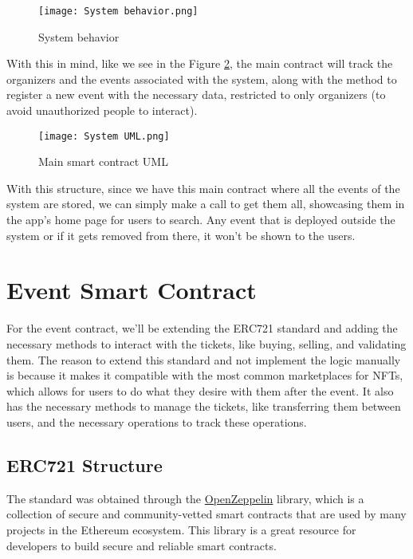 \begin{figure}[H]
	\texttt{[image: System behavior.png]}
	\centering
	\caption{System behavior}
	\label{fig:system_behavior}
\end{figure}

With this in mind, like we see in the Figure \ref{fig:system_uml}, the main
contract will track the organizers and the events associated with the system,
along with the method to register a new event with the necessary data,
restricted to only organizers (to avoid unauthorized people to interact).

\begin{figure}[H]
	\texttt{[image: System UML.png]}
	\centering
	\caption{Main smart contract UML}
	\label{fig:system_uml}
\end{figure}

With this structure, since we have this main contract where all the events of
the system are stored, we can simply make a call to get them all, showcasing
them in the app's home page for users to search. Any event that is deployed
outside the system or if it gets removed from there, it won't be shown to the
users.

\section{Event Smart Contract}
\label{sec:event_smart_contract}

For the event contract, we'll be extending the ERC721 standard and adding the
necessary methods to interact with the tickets, like buying, selling, and
validating them. The reason to extend this standard and not implement the logic
manually is because it makes it compatible with the most common marketplaces
for NFTs, which allows for users to do what they desire with them after the
event. It also has the necessary methods to manage the tickets, like
transferring them between users, and the necessary operations to track these
operations.

\subsection{ERC721 Structure}
\label{subsec:erc721_structure}

The standard was obtained through the
\href{https://docs.openzeppelin.com/contracts/api/token/erc721#ERC721}{OpenZeppelin}
library, which is a collection of secure and community-vetted smart contracts
that are used by many projects in the Ethereum ecosystem. This library is a
great resource for developers to build secure and reliable smart contracts.

